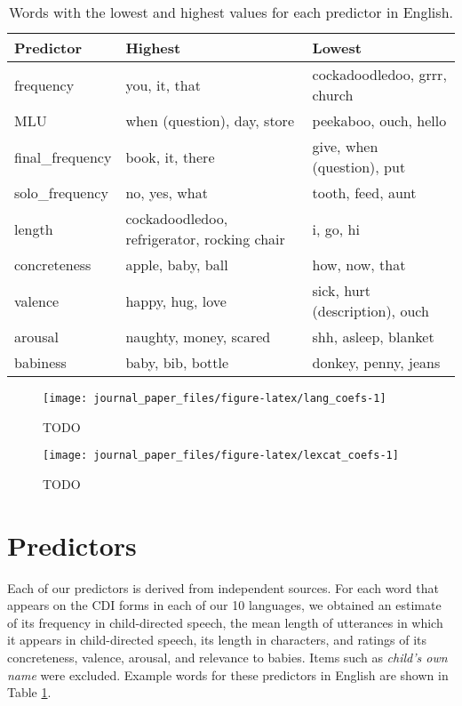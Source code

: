 \documentclass[9pt,twocolumn,twoside]{pnas-new}
\begin{document}
\begin{table}[b!]
\centering
\begin{tabular}{lll}
  \hline
Predictor & Highest & Lowest \\ 
  \hline
frequency & you, it, that & cockadoodledoo, grrr, church \\ 
  MLU & when (question), day, store & peekaboo, ouch, hello \\ 
  final\_frequency & book, it, there & give, when (question), put \\ 
  solo\_frequency & no, yes, what & tooth, feed, aunt \\ 
  length & cockadoodledoo, refrigerator,
 rocking chair & i, go, hi \\ 
  concreteness & apple, baby, ball & how, now, that \\ 
  valence & happy, hug, love & sick, hurt (description), ouch \\ 
  arousal & naughty, money, scared & shh, asleep, blanket \\ 
  babiness & baby, bib, bottle & donkey, penny, jeans \\ 
   \hline
\end{tabular}
\caption{Words with the lowest and highest values for each predictor in English.} 
\label{table:extremes}
\end{table}

\begin{figure*}

{\centering \texttt{[image: journal\_paper\_files/figure-latex/lang\_coefs-1]} 

}

\caption{TODO}\label{fig:lang_coefs}
\end{figure*}

\begin{figure*}

{\centering \texttt{[image: journal\_paper\_files/figure-latex/lexcat\_coefs-1]} 

}

\caption{TODO}\label{fig:lexcat_coefs}
\end{figure*}

\section*{Predictors}\label{predictors}

Each of our predictors is derived from independent sources. For each
word that appears on the CDI forms in each of our 10 languages, we
obtained an estimate of its frequency in child-directed speech, the mean
length of utterances in which it appears in child-directed speech, its
length in characters, and ratings of its concreteness, valence, arousal,
and relevance to babies. Items such as \emph{child's own name} were
excluded. Example words for these predictors in English are shown in
Table \ref{table:extremes}.
\end{document}
